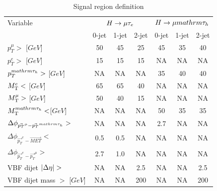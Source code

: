 \documentclass[oneside, letterpaper, oldfontcommands]{memoir}
\DeclarePairedDelimiter{\abs}{\lvert}{\rvert}
\begin{document}
{{{\begin{table}[hbtp]
 \centering
 \caption{Signal region definition}
  \label{tab:kinematicselection}
   \begin{tabular}{lccc|ccc} \hline
Variable &\multicolumn{3}{c|}{$H\rightarrow\mu\mathrm{\tau}_{e}$ }                 &     \multicolumn{3}{c}{$H \rightarrow \mu mathrm{\tau_{h}}$}
 \\ \cline{2-7}
                                         &  0-jet        & 1-jet       & 2-jet         &  0-jet         & 1-jet       & 2-jet  \\ \hline
$p_{T}^{\mu}>$ [$GeV$]                                      &     50        &   45        &   25          &  45            & 35          &  40    \\
$p_{T}^{e}>$ [$GeV$]                                      &     15        &   15        &   15          &   NA          &  NA        &  NA      \\
$p_{T}^{mathrm{\tau_{h}}}>$ [$GeV$]                                    &     NA       &    NA      &    NA        &  35            & 40          &  40    \\
$M_\mathrm{T}^{e}<$ [$GeV$]                                      &     65        &   65        &   40          &    NA         &   NA       &  NA      \\
$M_\mathrm{T}^{\mu}>$ [$GeV$]                                     &    50         &   40        &   15          &    NA         &   NA       &  NA      \\
$M_\mathrm{T}^{mathrm{\tau_{h}}}<$[$GeV$]                                     &     NA       &    NA      &    NA        &  50            & 35          &   35   \\   \hline
$\Delta \phi_{\vec{p_{T}}^{\mu}-\vec{p_{T}}^{mathrm{\tau_{h}}}}>$      &     NA       &    NA      &    NA        &  2.7           &  NA        &  NA      \\
$\Delta \phi_{\vec{p_{T}}^{e}-\vec{MET}}<$             &    0.5        &   0.5       &   NA         &    NA         &  NA        &  NA      \\
$\Delta \phi_{\vec{p_{T}}^{e}-\vec{p_{T}}^{\mu}}>$        &    2.7       &   1.0       &    NA        &    NA         &   NA       &  NA      \\  \hline
VBF dijet $\abs{\Delta \eta} > $                      &    NA        &    NA      &   2.5         &  NA           &   NA       &  2.5     \\
VBF dijet mass $>$ [$GeV$]                                     &    NA        &    NA      &   200         &  NA           &   NA       &  200     \\ \hline
  \end{tabular}
\end{table}


}}}
\end{document}
